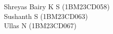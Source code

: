 \documentclass[12pt,a4paper]{report}
\theoremstyle{definition}
\theoremstyle{remark}
\begin{document}
\vspace{1.8cm}
\begin{flushright}
Shreyas Bairy K S (1BM23CD058)\\
Sushanth S (1BM23CD063)\\
Ullas N (1BM23CD067)\\
\end{flushright}

\newpage
\tableofcontents
\begin{center}
    \listoftables
\end{center}
\begin{center}
    \listoffigures
\end{center}

\clearpage
\end{document}
